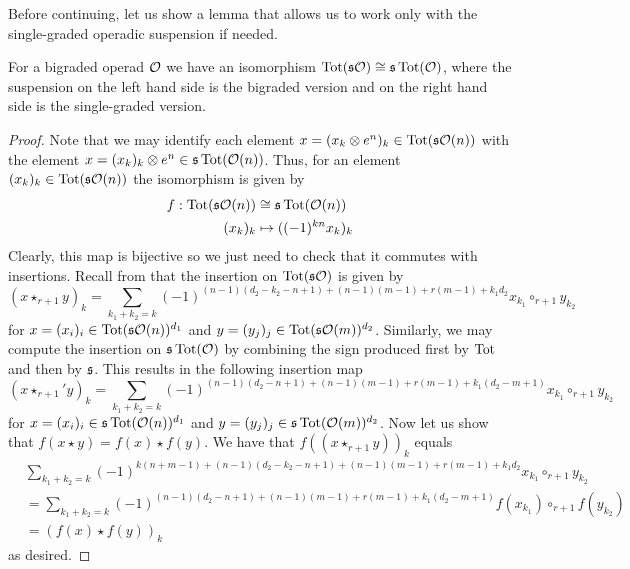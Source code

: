 \documentclass[Thesis.tex]{subfiles}
\begin{document}
Before continuing, let us show a lemma that allows us to work only with the single-graded operadic suspension if needed.
\begin{propo}\label{extrasign}
For a bigraded operad ${\mathcal O}$ we have an isomorphism $\operatorname{Tot}(\mathfrak{s}{\mathcal O})\cong \mathfrak{s} \operatorname{Tot}({\mathcal O})$, where the suspension on the left hand side is the bigraded version and on the right hand side is the single-graded version. 
\end{propo}
\begin{proof}
 Note that we may identify each element $x=(x_k\otimes e^n )_k\in\operatorname{Tot}(\mathfrak{s}{\mathcal O}(n))$ with the element $x=(x_k)_k\otimes e^n\in\mathfrak{s}\operatorname{Tot}({\mathcal O}(n))$. Thus, for an element $(x_k)_k\in \operatorname{Tot}(\mathfrak{s}{\mathcal O}(n))$ the isomorphism is given by
\begin{align*}
f:\operatorname{Tot}(\mathfrak{s}{\mathcal O}(n))&\cong \mathfrak{s} \operatorname{Tot}({\mathcal O}(n))\\
(x_k)_k&\mapsto ((-1)^{kn}x_k)_k
\end{align*}
Clearly, this map is bijective so we just need to check that it commutes with insertions. Recall from  that the insertion on $\operatorname{Tot}(\mathfrak{s}{\mathcal O})$ is given by
\begin{equation*}
(x\star_{r+1} y)_k=\sum_{k_1+k_2=k}(-1)^{(n-1)(d_2-k_2-n+1)+(n-1)(m-1)+r(m-1)+k_1d_2}x_{k_1}\circ_{r+1}y_{k_2}
\end{equation*}
for $x=(x_i)_i\in \operatorname{Tot}(\mathfrak{s}{\mathcal O}(n))^{d_1}$ and $y=(y_j)_j\in \operatorname{Tot}(\mathfrak{s}{\mathcal O}(m))^{d_2}$. Similarly, we may compute the insertion on $\mathfrak{s}\operatorname{Tot}({\mathcal O})$ by combining the sign produced first by $\operatorname{Tot}$ and then by $\mathfrak{s}$. This results in  the following insertion map 
\begin{equation*}
(x\star_{r+1}' y)_k=\sum_{k_1+k_2=k}(-1)^{(n-1)(d_2-n+1)+(n-1)(m-1)+r(m-1)+k_1(d_2-m+1)}x_{k_1}\circ_{r+1}y_{k_2}
\end{equation*}
for $x=(x_i)_i\in \mathfrak{s}\operatorname{Tot}({\mathcal O}(n))^{d_1}$ and $y=(y_j)_j\in \mathfrak{s}\operatorname{Tot}({\mathcal O}(m))^{d_2}$. Now let us show that $f(x\star y)=f(x)\star f(y)$. We have that $f((x\star_{r+1} y))_k$ equals 
\begin{align*}
&\sum_{k_1+k_2=k}(-1)^{k(n+m-1)+(n-1)(d_2-k_2-n+1)+(n-1)(m-1)+r(m-1)+k_1d_2}x_{k_1}\circ_{r+1}y_{k_2}\\
&=\sum_{k_1+k_2=k}(-1)^{(n-1)(d_2-n+1)+(n-1)(m-1)+r(m-1)+k_1(d_2-m+1)}f(x_{k_1})\circ_{r+1}f(y_{k_2})\\
&=(f(x)\star f(y))_k
\end{align*}
as desired.
\end{proof}
\end{document}
